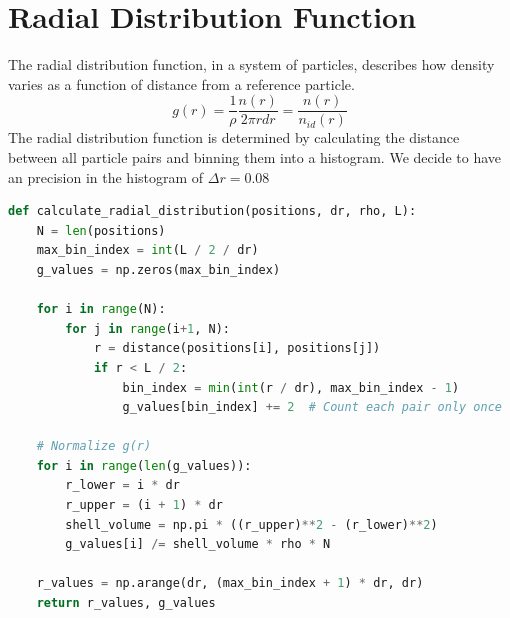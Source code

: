 \documentclass{article}
\begin{document}
\section{Radial Distribution Function}
The radial distribution function, in a system of particles, describes how density varies as a function of distance from a reference particle. 
\begin{equation}
    g(r)=\frac{1}{\rho}\frac{n(r)}{2\pi rdr}=\frac{n(r)}{n_{id}(r)}
\end{equation}
The radial distribution function is determined by calculating the distance between all particle pairs and binning them into a histogram. We decide to have an precision in the histogram of $\Delta r = 0.08$
\begin{lstlisting}[language=Python]
def calculate_radial_distribution(positions, dr, rho, L):
    N = len(positions)
    max_bin_index = int(L / 2 / dr)
    g_values = np.zeros(max_bin_index)
    
    for i in range(N):
        for j in range(i+1, N):
            r = distance(positions[i], positions[j])
            if r < L / 2:
                bin_index = min(int(r / dr), max_bin_index - 1)
                g_values[bin_index] += 2  # Count each pair only once
    
    # Normalize g(r)
    for i in range(len(g_values)):
        r_lower = i * dr
        r_upper = (i + 1) * dr
        shell_volume = np.pi * ((r_upper)**2 - (r_lower)**2)
        g_values[i] /= shell_volume * rho * N
    
    r_values = np.arange(dr, (max_bin_index + 1) * dr, dr)
    return r_values, g_values
\end{lstlisting}
\clearpage
\end{document}
